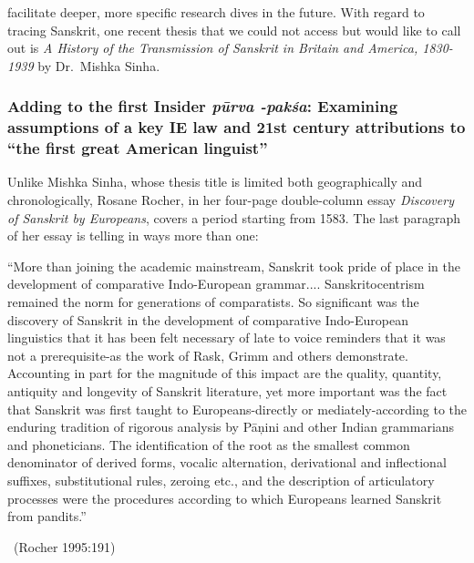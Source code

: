 facilitate deeper, more specific research dives in the future. With regard to tracing Sanskrit, one recent thesis that we could not access but would like to call out is \textit{A History of the Transmission of Sanskrit in Britain and America, 1830-1939} by Dr.\ Mishka Sinha.


\subsubsection{Adding to the first Insider \textit{pūrva -pakśa}: Examining assumptions of a key IE law and 21st century attributions to “the first great American linguist”}

Unlike Mishka Sinha, whose thesis title is limited both geographically and chronologically, Rosane Rocher, in her four-page double-column essay \textit{Discovery of Sanskrit by Europeans}, covers a period starting from 1583. The last paragraph of her essay is telling in ways more than one:

\begin{myquote}
“More than joining the academic mainstream, Sanskrit took pride of place in the development of comparative Indo-European grammar.... Sanskritocentrism remained the norm for generations of comparatists. So significant was the discovery of Sanskrit in the development of comparative Indo-European linguistics that it has been felt necessary of late to voice reminders that it was not a prerequisite-as the work of Rask, Grimm and others demonstrate. Accounting in part for the magnitude of this impact are the quality, quantity, antiquity and longevity of Sanskrit literature, yet more important was the fact that Sanskrit was first taught to Europeans-directly or mediately-according to the enduring tradition of rigorous analysis by Pāņini and other Indian grammarians and phoneticians. The identification of the root as the smallest common denominator of derived forms, vocalic alternation, derivational and inflectional suffixes, substitutional rules, zeroing etc., and the description of articulatory processes were the procedures according to which Europeans learned Sanskrit from pandits.”

~\hfill (Rocher 1995:191)
\end{myquote}

